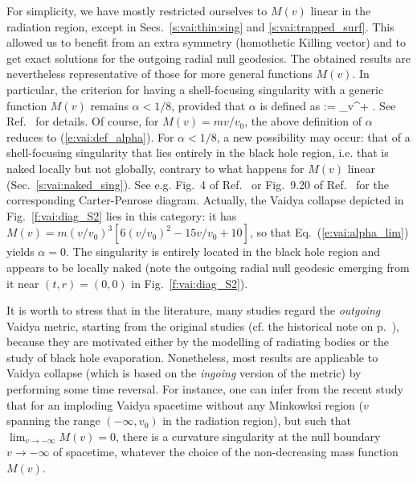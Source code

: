 For simplicity, we have mostly restricted ourselves to $M(v)$ linear in the radiation
region, except in Secs.~\ref{s:vai:thin:sing} and \ref{s:vai:trapped_surf}.
This allowed us to benefit from an extra symmetry (homothetic Killing vector) and to get
exact solutions for the outgoing radial null geodesics.
The obtained results are nevertheless representative of those for more
general functions
$M(v)$. In particular, the criterion for having a shell-focusing singularity
with a generic function $M(v)$ remains $\alpha < 1/8$, provided that $\alpha$ is defined
as
\be \label{e:vai:alpha_lim}
    \alpha := \lim_{v^+}  .
\ee
See Ref.~\cite{Kurod84,FayosT08} for details. Of course, for $M(v) = m v /v_0$, the
above definition of $\alpha$ reduces to (\ref{e:vai:def_alpha}).
For $\alpha < 1/8$, a new possibility may occur: that of a shell-focusing singularity
that lies entirely in the black hole region, i.e. that is naked locally but not globally,
contrary to what happens for $M(v)$ linear (Sec.~\ref{s:vai:naked_sing}).
See e.g. Fig.~4 of Ref.~\cite{AshteK04} or Fig.~9.20 of Ref.~\cite{GriffP09}
for the corresponding Carter-Penrose diagram.
Actually, the Vaidya collapse depicted in Fig.~\ref{f:vai:diag_S2} lies in this
category: it has $M(v) = m (v/v_0)^3 \left[ 6 (v/v_0)^2 - 15 v/v_0 + 10 \right]$,
so that Eq.~(\ref{e:vai:alpha_lim}) yields $\alpha = 0$.
The singularity is entirely located in the black
hole region and appears to be locally naked (note the outgoing radial null geodesic
emerging from it near $(t,r) = (0,0)$ in Fig.~\ref{f:vai:diag_S2}).

It is worth to stress that in the literature,
many studies regard the \emph{outgoing} Vaidya metric, starting from the original studies
(cf. the historical note on p.~\pageref{h:vai:origin}), because they are
motivated either by the modelling of radiating bodies or the
study of black hole evaporation. Nonetheless, most results are applicable
to Vaidya collapse (which is based on the
\emph{ingoing} version of the metric) by performing some time reversal.
For instance, one can infer from the recent study \cite{CoudrN21}
that for an imploding Vaidya spacetime without any Minkowksi region
($v$ spanning the range $(-\infty, v_0)$ in the radiation region),
but such that $\lim_{v\to -\infty} M(v) = 0$, there is a curvature singularity
at the null boundary $v\to -\infty$ of spacetime, whatever the choice of the
non-decreasing mass function $M(v)$.



